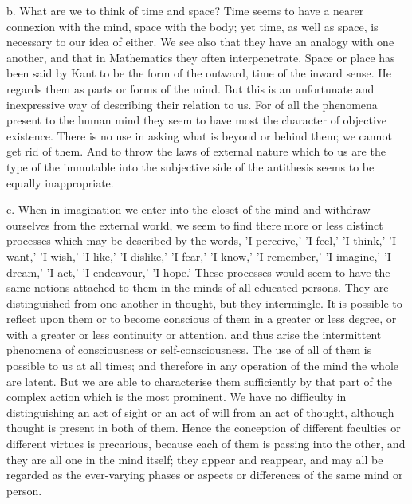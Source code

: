 b. What are we to think of time and space? Time seems to have a nearer
connexion with the mind, space with the body; yet time, as well as
space, is necessary to our idea of either. We see also that they have
an analogy with one another, and that in Mathematics they often
interpenetrate. Space or place has been said by Kant to be the form of
the outward, time of the inward sense. He regards them as parts or
forms of the mind. But this is an unfortunate and inexpressive way of
describing their relation to us. For of all the phenomena present to the
human mind they seem to have most the character of objective existence.
There is no use in asking what is beyond or behind them; we cannot get
rid of them. And to throw the laws of external nature which to us are
the type of the immutable into the subjective side of the antithesis
seems to be equally inappropriate.

c. When in imagination we enter into the closet of the mind and withdraw
ourselves from the external world, we seem to find there more or less
distinct processes which may be described by the words, 'I perceive,' 'I
feel,' 'I think,' 'I want,' 'I wish,' 'I like,' 'I dislike,' 'I fear,'
'I know,' 'I remember,' 'I imagine,' 'I dream,' 'I act,' 'I endeavour,'
'I hope.' These processes would seem to have the same notions attached
to them in the minds of all educated persons. They are distinguished
from one another in thought, but they intermingle. It is possible to
reflect upon them or to become conscious of them in a greater or less
degree, or with a greater or less continuity or attention, and thus
arise the intermittent phenomena of consciousness or self-consciousness.
The use of all of them is possible to us at all times; and therefore
in any operation of the mind the whole are latent. But we are able to
characterise them sufficiently by that part of the complex action which
is the most prominent. We have no difficulty in distinguishing an act
of sight or an act of will from an act of thought, although thought is
present in both of them. Hence the conception of different faculties or
different virtues is precarious, because each of them is passing into
the other, and they are all one in the mind itself; they appear and
reappear, and may all be regarded as the ever-varying phases or aspects
or differences of the same mind or person.

